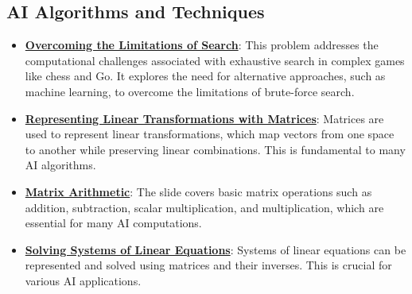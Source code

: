 \documentclass{article}%
\begin{document}
\subsection{AI Algorithms and Techniques}%
\label{subsec:AIAlgorithmsandTechniques}%
\begin{itemize}[leftmargin=*]%
\item \href{https://purdue.brightspace.com/d2l/common/assets/pdfjs-d2l-dist/1.0.14-legacy/web/viewer.html?file=\%2Fcontent\%2Fenforced\%2F1095467-wl.202510.CS.24300.001\%2F02L2-Intro.pdf\%3Fou\%3D1095467\&lang=en-us\&container=d2l-fileviewer-rendered-pdf\&fullscreen=d2l-fileviewer-rendered-pdf-dialog\&height=667#page=11}{\textbf{Overcoming the Limitations of Search}}: This problem addresses the computational challenges associated with exhaustive search in complex games like chess and Go. It explores the need for alternative approaches, such as machine learning, to overcome the limitations of brute{-}force search.%
\item \href{https://purdue.brightspace.com/d2l/common/assets/pdfjs-d2l-dist/1.0.14-legacy/web/viewer.html?file=\%2Fcontent\%2Fenforced\%2F1095467-wl.202510.CS.24300.001\%2F04L1-Linear Algebra Primer.pdf\%3Fou\%3D1095467\&lang=en-us\&container=d2l-fileviewer-rendered-pdf\&fullscreen=d2l-fileviewer-rendered-pdf-dialog\&height=667#page=5}{\textbf{Representing Linear Transformations with Matrices}}: Matrices are used to represent linear transformations, which map vectors from one space to another while preserving linear combinations. This is fundamental to many AI algorithms.%
\item \href{https://purdue.brightspace.com/d2l/common/assets/pdfjs-d2l-dist/1.0.14-legacy/web/viewer.html?file=\%2Fcontent\%2Fenforced\%2F1095467-wl.202510.CS.24300.001\%2F04L1-Linear Algebra Primer.pdf\%3Fou\%3D1095467\&lang=en-us\&container=d2l-fileviewer-rendered-pdf\&fullscreen=d2l-fileviewer-rendered-pdf-dialog\&height=667#page=9}{\textbf{Matrix Arithmetic}}: The slide covers basic matrix operations such as addition, subtraction, scalar multiplication, and multiplication, which are essential for many AI computations.%
\item \href{https://purdue.brightspace.com/d2l/common/assets/pdfjs-d2l-dist/1.0.14-legacy/web/viewer.html?file=\%2Fcontent\%2Fenforced\%2F1095467-wl.202510.CS.24300.001\%2F04L1-Linear Algebra Primer.pdf\%3Fou\%3D1095467\&lang=en-us\&container=d2l-fileviewer-rendered-pdf\&fullscreen=d2l-fileviewer-rendered-pdf-dialog\&height=667#page=11}{\textbf{Solving Systems of Linear Equations}}: Systems of linear equations can be represented and solved using matrices and their inverses. This is crucial for various AI applications.%

\end{itemize}
\end{document}
